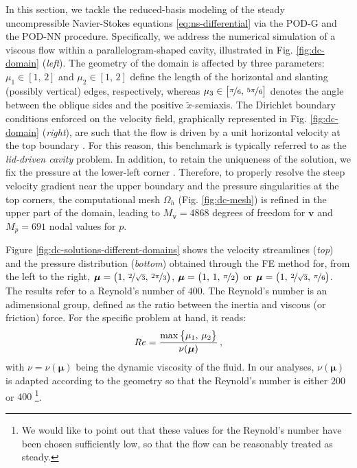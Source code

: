 \documentclass[12pt, a4paper, twoside, openright, notitlepage]{report}
\numberwithin{equation}{chapter}
\theoremstyle{theorem}
\theoremstyle{definition}
\theoremstyle{remark}
\theoremstyle{proposition}
\numberwithin{figure}{chapter}
\newcommand{\wt}[1]{\widetilde{#1}}
\newcommand{\bg}[1]{\boldsymbol{#1}}
\begin{document}
		In this section, we tackle the reduced-basis modeling of the steady uncompressible Navier-Stokes equations \eqref{eq:ns-differential} via the POD-G and the POD-NN procedure. Specifically, we address the numerical simulation of a viscous flow within a parallelogram-shaped cavity, illustrated in Fig. \ref{fig:dc-domain} (\emph{left}). The geometry of the domain is affected by three parameters: $\mu_1 \in [1, \, 2]$ and $\mu_2 \in [1, \, 2]$ define the length of the horizontal and slanting (possibly vertical) edges, respectively, whereas $\mu_3 \in \big[ \nicefrac{\pi}{6}, \, \nicefrac{5 \pi}{6} \big]$ denotes the angle between the oblique sides and the positive $\wt{x}$-semiaxis. The Dirichlet boundary conditions enforced on the velocity field, graphically represented in Fig. \ref{fig:dc-domain} (\emph{right}), are such that the flow is driven by a unit horizontal velocity at the top boundary \cite{Per02}. For this reason, this benchmark is typically referred to as the \emph{lid-driven cavity} problem. In addition, to retain the uniqueness of the solution, we fix the pressure at the lower-left corner \cite{Dho14}. Therefore, to properly resolve the steep velocity gradient near the upper boundary and the pressure singularities at the top corners, the computational mesh $\Omega_h$ (Fig. \ref{fig:dc-mesh}) is refined in the upper part of the domain, leading to $M_{\bg{v}} = 4868$ degrees of freedom for $\bg{v}$ and $M_p = 691$ nodal values for $p$. 
		
		Figure \ref{fig:dc-solutions-different-domains} shows the velocity streamlines (\emph{top}) and the pressure distribution (\emph{bottom}) obtained through the FE method for, from the left to the right, $\bg{\mu} = \big( 1, \, \nicefrac{2}{\sqrt{3}}, \, \nicefrac{2 \pi}{3} \big)$, $\bg{\mu} = \big( 1, \, 1, \, \nicefrac{\pi}{2} \big)$ or $\bg{\mu} = \big( 1, \, \nicefrac{2}{\sqrt{3}}, \, \nicefrac{\pi}{6} \big)$. The results refer to a Reynold's number of $400$. The Reynold's number is an adimensional group, defined as the ratio between the inertia and viscous (or friction) force. For the specific problem at hand, it reads:
		\begin{equation*}
			\vspace*{-0.1cm}
			Re = \dfrac{\max \big\lbrace \mu_1, \, \mu_2 \big\rbrace}{\nu(\bg{\mu})} \, ,
		\end{equation*}
		with $\nu = \nu(\bg{\mu})$ being the dynamic viscosity of the fluid. In our analyses, $\nu(\bg{\mu})$ is adapted according to the geometry so that the Reynold's number is either $200$ or $400$ \vspace*{0.2cm} \footnote{We would like to point out that these values for the Reynold's number have been chosen sufficiently low, so that the flow can be reasonably treated as steady.}.
				
\end{document}
